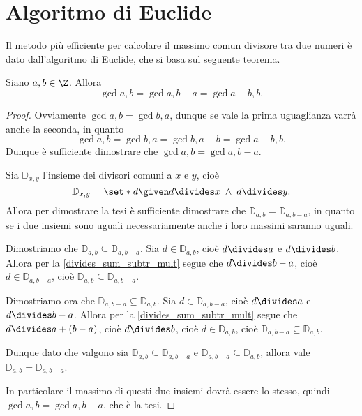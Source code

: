\section{Algoritmo di Euclide}

Il metodo più efficiente per calcolare il massimo comun divisore tra due numeri è dato dall'algoritmo di Euclide, che si basa sul seguente teorema.

\begin{theorem} \label{gcd_a_a-b}
    Siano $a, b \in \Z$. Allora
    \begin{equation}
        \gcd{a, b} = \gcd{a, b - a} = \gcd{a - b, b}.
    \end{equation} 
\end{theorem}
\begin{proof}  
    Ovviamente $\gcd{a, b} = \gcd{b, a}$, dunque se vale la prima uguaglianza varrà anche la seconda,
    in quanto 
    \[
       \gcd{a, b} = \gcd{b, a} = \gcd{b, a - b} = \gcd{a - b, b}.
    \] 
    Dunque è sufficiente
    dimostrare che $\gcd{a, b} = \gcd{a, b - a}$.

    Sia $\mathbb{D}_{x, y}$ l'insieme dei divisori comuni a $x$ e $y$, cioè
    \[
        \mathbb{D}_{x, y} = \set*{d \given d \divides x \;\land\; d \divides y }.
    \]
    Allora per dimostrare la tesi è sufficiente dimostrare che $\mathbb{D}_{a, b} = \mathbb{D}_{a, b - a}$, in quanto
    se i due insiemi sono uguali necessariamente anche i loro massimi saranno uguali.

    Dimostriamo che $\mathbb{D}_{a, b} \subseteq \mathbb{D}_{a, b - a}$. Sia $d \in \mathbb{D}_{a, b}$, 
    cioè $d \divides a$ e $d \divides b$. Allora per la \autoref{divides_sum_subtr_mult} segue che
    $d \divides b - a$, cioè $d \in \mathbb{D}_{a, b - a}$, 
    cioè $\mathbb{D}_{a, b} \subseteq \mathbb{D}_{a, b - a}$.

    Dimostriamo ora che $\mathbb{D}_{a, b - a} \subseteq \mathbb{D}_{a, b}$. 
    Sia $d \in \mathbb{D}_{a, b - a}$, 
    cioè $d \divides a$ e $d \divides b - a$. Allora per la \autoref{divides_sum_subtr_mult} segue che
    $d \divides a + (b - a)$, cioè $d \divides b$, cioè $d \in \mathbb{D}_{a, b}$, 
    cioè $\mathbb{D}_{a, b - a} \subseteq \mathbb{D}_{a, b}$.

    Dunque dato che valgono sia $\mathbb{D}_{a, b} \subseteq \mathbb{D}_{a, b - a}$ e 
    $\mathbb{D}_{a, b - a} \subseteq \mathbb{D}_{a, b}$, allora vale
    $\mathbb{D}_{a, b} = \mathbb{D}_{a, b - a}$. 
    
    In particolare il massimo di questi due insiemi
    dovrà essere lo stesso, quindi $\gcd{a, b} = \gcd{a, b - a}$, che è la tesi.
\end{proof}

